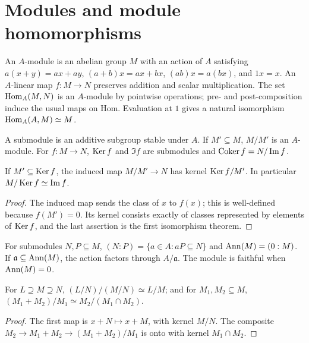 \section{Modules and module homomorphisms}
\label{am-ch2-modules}
\begin{definition}[Module]
\label{am-def-module}
\uses{}
An $A$-module is an abelian group $M$ with an action of $A$ satisfying
$a(x+y)=ax+ay$, $(a+b)x=ax+bx$, $(ab)x=a(bx)$, and $1x=x$.  An
$A$-linear map $f:M\to N$ preserves addition and scalar multiplication.
The set $\operatorname{Hom}_A(M,N)$ is an $A$-module by pointwise operations; pre- and
post-composition induce the usual maps on Hom.  Evaluation at $1$ gives a
natural isomorphism $\operatorname{Hom}_A(A,M)\simeq M$.
\end{definition}
\begin{definition}
\label{am-def-submodule-quotient}
\uses{}
A submodule is an additive subgroup stable under $A$.  If $M'\subseteq M$,
$M/M'$ is an $A$-module.  For $f:M\to N$, $\operatorname{Ker} f$ and $\Im f$ are
submodules and $\operatorname{Coker} f=N/\operatorname{Im} f$.
\end{definition}
\begin{proposition}
\label{am-prop-2-1a}
\uses{}
If $M'\subseteq\operatorname{Ker} f$, the induced map $M/M'\to N$ has kernel
$\operatorname{Ker} f/M'$.  In particular $M/\operatorname{Ker} f\simeq\operatorname{Im} f$.
\end{proposition}
\begin{proof}
The induced map sends the class of $x$ to $f(x)$; this is well-defined because
$f(M')=0$.  Its kernel consists exactly of classes represented by elements of
$\operatorname{Ker} f$, and the last assertion is the first isomorphism theorem.
\end{proof}
\begin{definition}
\label{am-def-ann-module}
\uses{}
For submodules $N,P\subseteq M$, $(N:P)=\{a\in A:aP\subseteq N\}$ and
$\operatorname{Ann}(M)=(0:M)$.  If $\mathfrak{a}\subseteq\operatorname{Ann}(M)$, the action factors through
$A/\mathfrak{a}$.  The module is faithful when $\operatorname{Ann}(M)=0$.
\end{definition}
\begin{proposition}
\label{am-prop-2-1}
\uses{}
For $L\supseteq M\supseteq N$,
$(L/N)/(M/N)\simeq L/M$; and for $M_1,M_2\subseteq M$,
$(M_1+M_2)/M_1\simeq M_2/(M_1\cap M_2)$.
\end{proposition}
\begin{proof}
The first map is $x+N\mapsto x+M$, with kernel $M/N$.  The composite
$M_2\to M_1+M_2\to(M_1+M_2)/M_1$ is onto with kernel $M_1\cap M_2$.
\end{proof}

